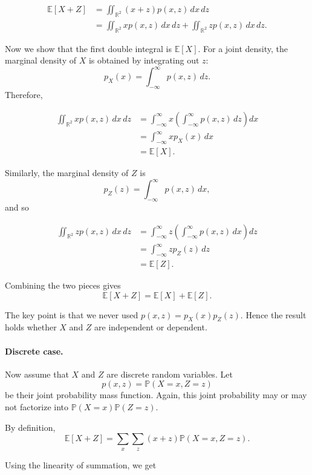 \documentclass{article}
\begin{document}
\begin{tcolorbox}[breakable,colback=gray!5,colframe=gray!60,title=Solution]
\begin{align*}
  \mathbb{E}[X+Z]
  &=
  \iint_{\mathbb{R}^2}
  (x+z)p(x,z)\,dx\,dz \\
  &=
  \iint_{\mathbb{R}^2}
  xp(x,z)\,dx\,dz
  +
  \iint_{\mathbb{R}^2}
  zp(x,z)\,dx\,dz.
\end{align*}

Now we show that the first double integral is \(\mathbb{E}[X]\). For a joint density,
the marginal density of \(X\) is obtained by integrating out \(z\):
\[
  p_X(x) = \int_{-\infty}^{\infty} p(x,z)\,dz.
\]
Therefore,

\begin{align*}
  \iint_{\mathbb{R}^2}
  xp(x,z)\,dx\,dz
  &=
  \int_{-\infty}^{\infty}
  x
  \left(
    \int_{-\infty}^{\infty} p(x,z)\,dz
  \right)
  dx \\
  &=
  \int_{-\infty}^{\infty} x p_X(x)\,dx \\
  &=
  \mathbb{E}[X].
\end{align*}

Similarly, the marginal density of \(Z\) is
\[
  p_Z(z) = \int_{-\infty}^{\infty} p(x,z)\,dx,
\]
and so

\begin{align*}
  \iint_{\mathbb{R}^2}
  zp(x,z)\,dx\,dz
  &=
  \int_{-\infty}^{\infty}
  z
  \left(
    \int_{-\infty}^{\infty} p(x,z)\,dx
  \right)
  dz \\
  &=
  \int_{-\infty}^{\infty} z p_Z(z)\,dz \\
  &=
  \mathbb{E}[Z].
\end{align*}

Combining the two pieces gives
\[
  \mathbb{E}[X+Z]
  =
  \mathbb{E}[X]+\mathbb{E}[Z].
\]

The key point is that we never used \(p(x,z)=p_X(x)p_Z(z)\). Hence the result holds
whether \(X\) and \(Z\) are independent or dependent.

\paragraph{Discrete case.}
Now assume that \(X\) and \(Z\) are discrete random variables. Let
\[
  p(x,z) = \mathbb{P}(X=x,Z=z)
\]
be their joint probability mass function. Again, this joint probability may or may not
factorize into \(\mathbb{P}(X=x)\mathbb{P}(Z=z)\).

By definition,
\[
  \mathbb{E}[X+Z]
  =
  \sum_x \sum_z (x+z)\mathbb{P}(X=x,Z=z).
\]

Using the linearity of summation, we get


\end{tcolorbox}
\end{document}
